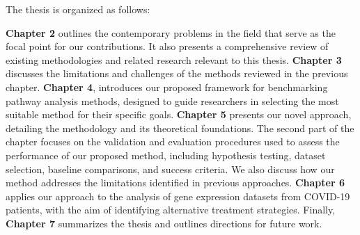 \documentclass[Minh_PhD_thesis.tex]{subfiles}
\begin{document}
The thesis is organized as follows:

\textbf{Chapter 2} outlines the contemporary problems in the field that serve as the focal point for our contributions. It also presents a comprehensive review of existing methodologies and related research relevant to this thesis.
\textbf{Chapter 3} discusses the limitations and challenges of the methods reviewed in the previous chapter.
\textbf{Chapter 4}, introduces our proposed framework for benchmarking pathway analysis methods, designed to guide researchers in selecting the most suitable method for their specific goals. 
\textbf{Chapter 5} presents our novel approach, detailing the methodology and its theoretical foundations. The second part of the chapter focuses on the validation and evaluation procedures used to assess the performance of our proposed method, including hypothesis testing, dataset selection, baseline comparisons, and success criteria. We also discuss how our method addresses the limitations identified in previous approaches.
\textbf{Chapter 6} applies our approach to the analysis of gene expression datasets from COVID-19 patients, with the aim of identifying alternative treatment strategies.
Finally, \textbf{Chapter 7} summarizes the thesis and outlines directions for future work.


%
%
\end{document}
